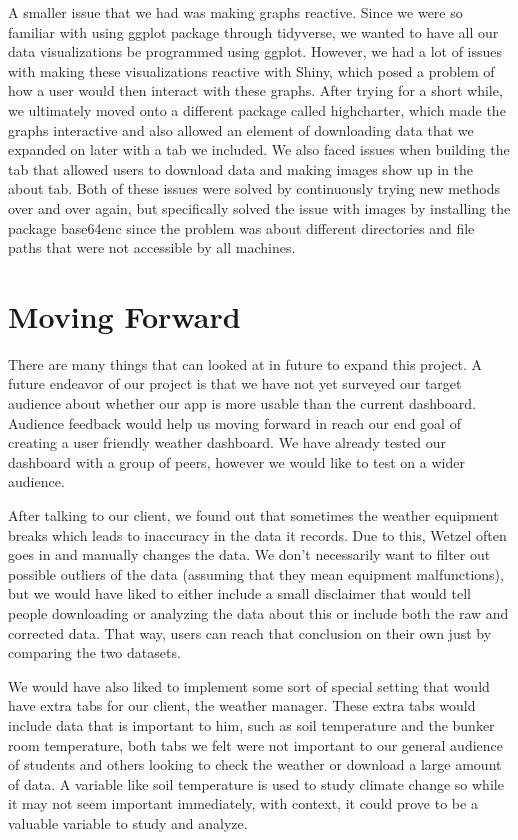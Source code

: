 \documentclass[10pt,letterpaper]{article}
\begin{document}
A smaller issue that we had was making graphs reactive. Since we were so
familiar with using ggplot package through tidyverse, we wanted to have
all our data visualizations be programmed using ggplot. However, we had
a lot of issues with making these visualizations reactive with Shiny,
which posed a problem of how a user would then interact with these
graphs. After trying for a short while, we ultimately moved onto a
different package called highcharter, which made the graphs interactive
and also allowed an element of downloading data that we expanded on
later with a tab we included. We also faced issues when building the tab
that allowed users to download data and making images show up in the
about tab. Both of these issues were solved by continuously trying new
methods over and over again, but specifically solved the issue with
images by installing the package base64enc since the problem was about
different directories and file paths that were not accessible by all
machines.

\section{Moving Forward}\label{moving-forward}

There are many things that can looked at in future to expand this
project. A future endeavor of our project is that we have not yet
surveyed our target audience about whether our app is more usable than
the current dashboard. Audience feedback would help us moving forward in
reach our end goal of creating a user friendly weather dashboard. We
have already tested our dashboard with a group of peers, however we
would like to test on a wider audience.

After talking to our client, we found out that sometimes the weather
equipment breaks which leads to inaccuracy in the data it records. Due
to this, Wetzel often goes in and manually changes the data. We don't
necessarily want to filter out possible outliers of the data (assuming
that they mean equipment malfunctions), but we would have liked to
either include a small disclaimer that would tell people downloading or
analyzing the data about this or include both the raw and corrected
data. That way, users can reach that conclusion on their own just by
comparing the two datasets.

We would have also liked to implement some sort of special setting that
would have extra tabs for our client, the weather manager. These extra
tabs would include data that is important to him, such as soil
temperature and the bunker room temperature, both tabs we felt were not
important to our general audience of students and others looking to
check the weather or download a large amount of data. A variable like
soil temperature is used to study climate change so while it may not
seem important immediately, with context, it could prove to be a
valuable variable to study and analyze.
\end{document}
